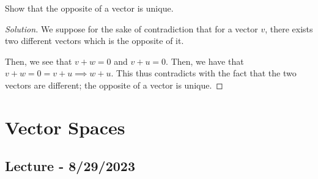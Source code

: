 \documentclass[openany]{book}
\newenvironment{solution}{\begin{proof}[Solution]}{\end{proof}}
\begin{document}
	\begin{hw}
		Show that the opposite of a vector is unique.
	\end{hw}
	\begin{solution}
		We suppose for the sake of contradiction that for a vector $v$, there exists two different vectors which is the opposite of it.
		
		Then, we see that $v + w = 0$ and $v + u = 0$. Then, we have that $v + w = 0 = v + u \implies w + u$. This thus contradicts with the fact that the two vectors are different; the opposite of a vector is unique.
	\end{solution}
	
	\chapter{Vector Spaces}
	\section{Lecture - 8/29/2023}
\end{document}
